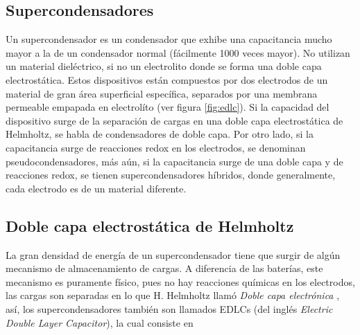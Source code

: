 %

\subsection{Supercondensadores}
Un supercondensador es un condensador que exhibe una capacitancia mucho mayor a la de un condensador normal (fácilmente 1000 veces mayor). No utilizan un material dieléctrico, si no un electrolito donde se forma una doble capa electrostática. Estos dispositivos están compuestos por dos electrodos de un material de gran área superficial específica, separados por una membrana permeable empapada en electrolíto (ver figura \ref{fig:edlc}). Si la capacidad del dispositivo surge de la separación de cargas en una doble capa electrostática de Helmholtz, se habla de condensadores de doble capa. Por otro lado, si la capacitancia surge de reacciones redox en los electrodos, se denominan pseudocondensadores, más aún, si la capacitancia surge de una doble capa y de reacciones redox, se tienen supercondensadores híbridos, donde generalmente, cada electrodo es de un material diferente.

\subsection{Doble capa electrostática de Helmholtz}
La gran densidad de energía de un supercondensador tiene que surgir de algún mecanismo de almacenamiento de cargas. A diferencia de las baterías, este mecanismo es puramente físico, pues no hay reacciones químicas en los electrodos, las cargas son separadas en lo que H. Helmholtz llamó \emph{Doble capa electrónica} \citep{Frackowiak2001}, así, los supercondensadores también son llamados EDLCs (del inglés \emph{Electric Double Layer Capacitor}), la cual consiste en

